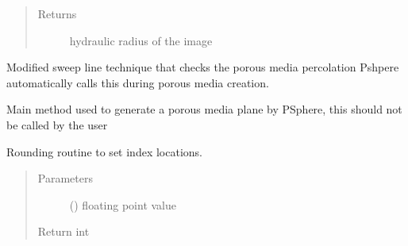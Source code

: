 \documentclass[letterpaper,10pt,english]{sphinxmanual}
\begin{document}
\begin{fulllineitems}
\begin{fulllineitems}
\begin{quote}
\begin{description}
\item[{Returns}] \leavevmode
hydraulic radius of the image

\end{description}\end{quote}

\end{fulllineitems}


\begin{fulllineitems}
\label{\detokenize{index:lb_colloids.utilities.psphere.PSphere.check_percolation}}
Modified sweep line technique that checks the porous media percolation
Pshpere automatically calls this during porous media creation.

\end{fulllineitems}


\begin{fulllineitems}
\label{\detokenize{index:lb_colloids.utilities.psphere.PSphere.generate_plane}}
Main method used to generate a porous media plane by PSphere,
this should not be called by the user

\end{fulllineitems}


\begin{fulllineitems}
\label{\detokenize{index:lb_colloids.utilities.psphere.PSphere.iround}}
Rounding routine to set index locations.
\begin{quote}\begin{description}
\item[{Parameters}] \leavevmode
{} () \textendash{} floating point value

\item[{Return int}] \leavevmode
\end{description}\end{quote}

\end{fulllineitems}



\end{fulllineitems}
\end{document}
